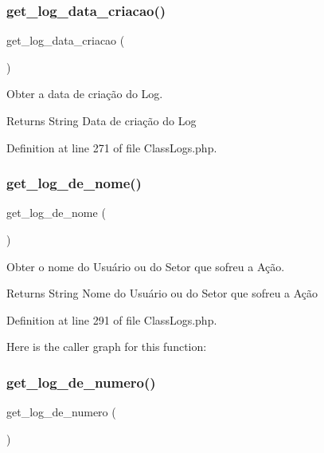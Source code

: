 \subsubsection{\texorpdfstring{get\+\_\+log\+\_\+data\+\_\+criacao()}{get\_log\_data\_criacao()}}
{\footnotesize\ttfamily get\+\_\+log\+\_\+data\+\_\+criacao (\begin{DoxyParamCaption}{ }\end{DoxyParamCaption})}



Obter a data de criação do Log. 

\begin{DoxyReturn}{Returns}
String Data de criação do Log 
\end{DoxyReturn}


Definition at line 271 of file Class\+Logs.\+php.

\mbox{\label{class_class_logs_a50549ddf425a8f141dc9e05479611452}} 
\subsubsection{\texorpdfstring{get\+\_\+log\+\_\+de\+\_\+nome()}{get\_log\_de\_nome()}}
{\footnotesize\ttfamily get\+\_\+log\+\_\+de\+\_\+nome (\begin{DoxyParamCaption}{ }\end{DoxyParamCaption})}



Obter o nome do Usuário ou do Setor que sofreu a Ação. 

\begin{DoxyReturn}{Returns}
String Nome do Usuário ou do Setor que sofreu a Ação 
\end{DoxyReturn}


Definition at line 291 of file Class\+Logs.\+php.

Here is the caller graph for this function\+:
\mbox{\label{class_class_logs_a9bc8d06ed7bddb98e3748f8692bf3082}} 
\subsubsection{\texorpdfstring{get\+\_\+log\+\_\+de\+\_\+numero()}{get\_log\_de\_numero()}}
{\footnotesize\ttfamily get\+\_\+log\+\_\+de\+\_\+numero (\begin{DoxyParamCaption}{ }\end{DoxyParamCaption})}




